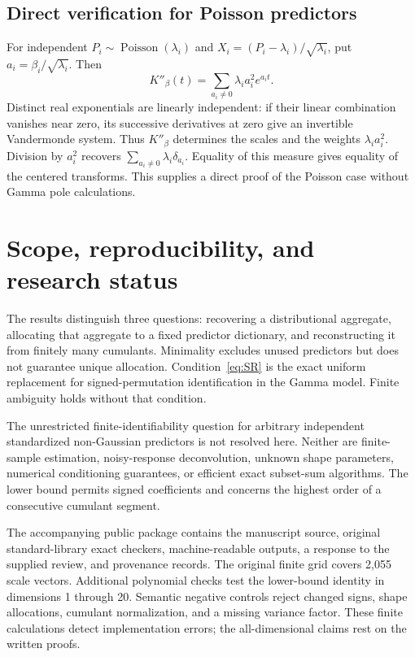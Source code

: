\documentclass[11pt]{article}
\theoremstyle{definition}\newtheorem{definition}[theorem]{Definition}
\theoremstyle{remark}\newtheorem{remark}[theorem]{Remark}
\begin{document}
\subsection{Direct verification for Poisson predictors}
For independent $P_i\sim\operatorname{Poisson}(\lambda_i)$ and $X_i=(P_i-\lambda_i)/\sqrt{\lambda_i}$, put $a_i=\beta_i/\sqrt{\lambda_i}$. Then
\[
 K''_\beta(t)=\sum_{a_i\ne0}\lambda_i a_i^2e^{a_it}.
\]
Distinct real exponentials are linearly independent: if their linear combination vanishes near zero, its successive derivatives at zero give an invertible Vandermonde system. Thus $K''_\beta$ determines the scales and the weights $\lambda_i a_i^2$. Division by $a_i^2$ recovers $\sum_{a_i\ne0}\lambda_i\delta_{a_i}$. Equality of this measure gives equality of the centered transforms. This supplies a direct proof of the Poisson case without Gamma pole calculations.

\section{Scope, reproducibility, and research status}
The results distinguish three questions: recovering a distributional aggregate, allocating that aggregate to a fixed predictor dictionary, and reconstructing it from finitely many cumulants. Minimality excludes unused predictors but does not guarantee unique allocation. Condition~\eqref{eq:SR} is the exact uniform replacement for signed-permutation identification in the Gamma model. Finite ambiguity holds without that condition.

The unrestricted finite-identifiability question for arbitrary independent standardized non-Gaussian predictors is not resolved here. Neither are finite-sample estimation, noisy-response deconvolution, unknown shape parameters, numerical conditioning guarantees, or efficient exact subset-sum algorithms. The lower bound permits signed coefficients and concerns the highest order of a consecutive cumulant segment.

The accompanying public package contains the manuscript source, original standard-library exact checkers, machine-readable outputs, a response to the supplied review, and provenance records. The original finite grid covers 2,055 scale vectors. Additional polynomial checks test the lower-bound identity in dimensions 1 through 20. Semantic negative controls reject changed signs, shape allocations, cumulant normalization, and a missing variance factor. These finite calculations detect implementation errors; the all-dimensional claims rest on the written proofs.
\end{document}
